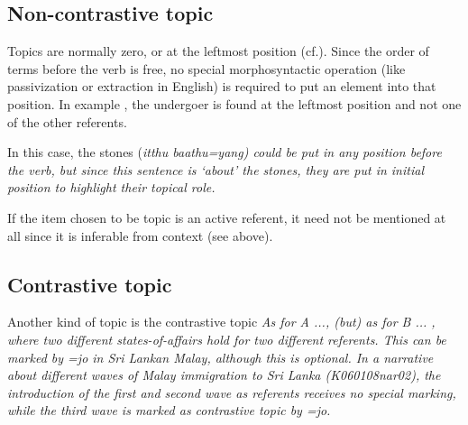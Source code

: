 
\subsection{Non-contrastive topic}\label{sec:disc:Non-contrastivetopic}
Topics are normally zero, or at the leftmost position (cf.). Since the order of terms before the verb is free, no special morphosyntactic operation (like passivization or extraction in English) is required to put an element into that position. In example , the undergoer  is found at the leftmost position and not one of the other referents.



In this case, the stones (\em itthu baathu=yang\em) could be put in any position before the verb, but since this sentence is `about' the stones, they are put in initial position to highlight their topical role.

If the item chosen to be topic is an active referent, it need not be mentioned at all since it is inferable from context (see above).

\subsection{Contrastive topic}\label{sec:disc:Contrastivetopic}
Another kind of topic is the contrastive topic \em As for A ..., (but) as for B ... \em, where two different states-of-affairs hold for two different referents. This can be marked by \em =jo \em {} in Sri Lankan Malay, although this is optional.
In a narrative about different waves of Malay immigration to Sri Lanka (K060108nar02), the introduction of the first and second wave as referents receives no special marking, while the third wave is marked as contrastive topic by \em =jo\em.

